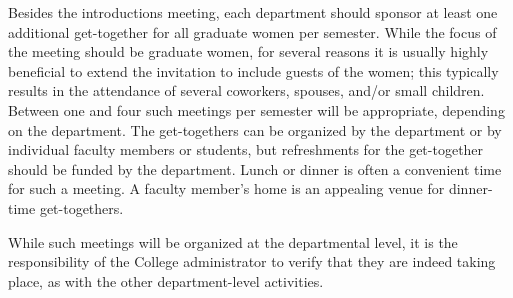 Besides the introductions meeting, 
each department should sponsor at least one additional
get-together for all graduate women per semester.
While the focus of the meeting should be graduate women, 
for several reasons
it is usually highly beneficial to extend the invitation
to  include guests of the women;
this typically results in the attendance
of several coworkers, spouses, and/or small children.
Between one and four such meetings per semester will be appropriate, depending
on the department.
The get-togethers can be organized by the department or by individual
faculty members or students, but refreshments for the get-together
should be funded by the department.
Lunch or dinner is often a convenient time for such a meeting.
A faculty member's home is an appealing venue for dinner-time get-togethers.

While such meetings will be organized at the departmental level, it
is the responsibility of the College administrator to verify that
they are indeed taking place, as with the other department-level
activities.

\eject
